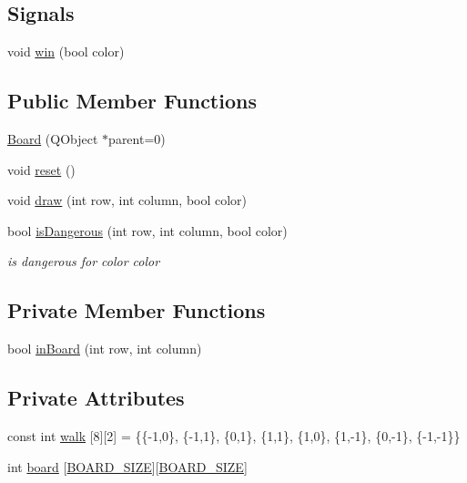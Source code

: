 \subsection*{Signals}
\begin{DoxyCompactItemize}
\item 
void \hyperlink{classBoard_ac3725569d7c112f0fbf8fc9a4aee1477}{win} (bool color)
\end{DoxyCompactItemize}
\subsection*{Public Member Functions}
\begin{DoxyCompactItemize}
\item 
\hyperlink{classBoard_a40471004facb958cf0e60840cd441ab8}{Board} (Q\+Object $\ast$parent=0)
\item 
void \hyperlink{classBoard_aaef819a8d1a10c35d9f802195802236e}{reset} ()
\item 
void \hyperlink{classBoard_a9d29e2f76551363e49e93467f7ca7ece}{draw} (int row, int column, bool color)
\item 
bool \hyperlink{classBoard_aec12d14fa7095b68e176dd7c6e8bf73b}{is\+Dangerous} (int row, int column, bool color)
\begin{DoxyCompactList}\small\item\em is dangerous for color {\ttfamily color} \end{DoxyCompactList}\end{DoxyCompactItemize}
\subsection*{Private Member Functions}
\begin{DoxyCompactItemize}
\item 
bool \hyperlink{classBoard_a2f339d1294177dc9cb1a0c160b1427f5}{in\+Board} (int row, int column)
\end{DoxyCompactItemize}
\subsection*{Private Attributes}
\begin{DoxyCompactItemize}
\item 
const int \hyperlink{classBoard_a362b986e66494ee079a6dd2b8b08075f}{walk} \mbox{[}8\mbox{]}\mbox{[}2\mbox{]} = \{\{-\/1,0\}, \{-\/1,1\}, \{0,1\}, \{1,1\}, \{1,0\}, \{1,-\/1\}, \{0,-\/1\}, \{-\/1,-\/1\}\}
\item 
int \hyperlink{classBoard_af4a66521596ff3eef6685b7e15438977}{board} \mbox{[}\hyperlink{const_8h_aa7a2b8ea2c784a4ad8b58a3262bb4f07}{B\+O\+A\+R\+D\+\_\+\+S\+I\+ZE}\mbox{]}\mbox{[}\hyperlink{const_8h_aa7a2b8ea2c784a4ad8b58a3262bb4f07}{B\+O\+A\+R\+D\+\_\+\+S\+I\+ZE}\mbox{]}
\end{DoxyCompactItemize}


